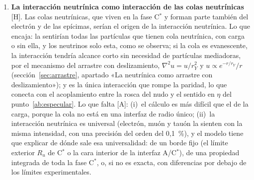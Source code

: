 \documentclass[11pt,a4paper]{article}
\newcommand{\st}[1]{\textup{[#1]}}
\newcommand{\Cst}{C\ensuremath{^{*}}}
\begin{document}
\begin{enumerate}[label=\arabic*.,ref=\arabic*,leftmargin=*]
\item \label{ab:neutrinica}\textbf{La interacción neutrínica como interacción de las colas neutrínicas} \st{H}. Las colas neutrínicas, que viven en la fase \Cst{} y forman parte también del electrón y de las epícimas, serían el origen de la interacción neutrínica. Lo que encaja: la sentirían todas las partículas que tienen cola neutrínica, con carga o sin ella, y los neutrinos solo esta, como se observa; si la cola es evanescente, la interacción tendría alcance corto sin necesidad de partículas mediadoras, por el mecanismo del arrastre con deslizamiento, $\nabla^2u=u/r_Y^2$ y $u\propto e^{-r/r_Y}/r$ (sección~\ref{sec:arrastre}, apartado «La neutrínica como arrastre con deslizamiento»); y es la única interacción que rompe la paridad, lo que conecta con el acoplamiento entre la rosca del nudo y el sentido en $\eta$ del punto~\ref{ab:especular}. Lo que falta \st{A}: (i)~el cálculo es más difícil que el de la carga, porque la cola no está en una interfaz de radio único; (ii)~la interacción neutrínica es universal (electrón, muón y tauón la sienten con la misma intensidad, con una precisión del orden del 0,1~\%), y el modelo tiene que explicar de dónde sale esa universalidad: de un borde fijo (el límite exterior $R_u$ de \Cst{} o la cara interior de la interfaz A/\Cst), de una propiedad integrada de toda la fase \Cst, o, si no es exacta, con diferencias por debajo de los límites experimentales.


\end{enumerate}
\end{document}
